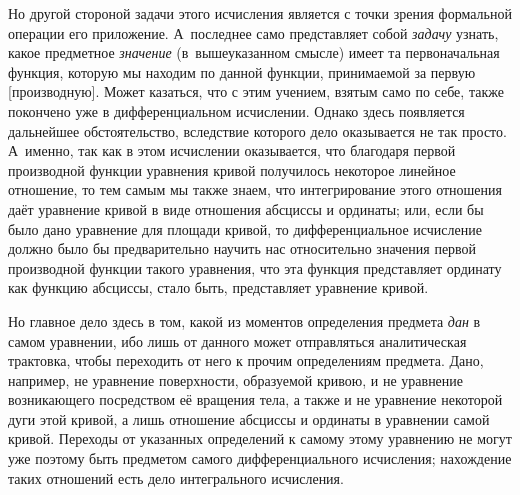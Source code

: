 Но другой стороной задачи этого исчисления является с точки зрения формальной
операции его приложение. А~последнее само представляет собой {\em задачу}
узнать, какое предметное {\em значение} (в~вышеуказанном смысле) имеет та
первоначальная функция, которую мы находим по данной функции, принимаемой за
первую [производную]. Может казаться, что с этим учением, взятым само по себе,
также покончено уже в дифференциальном исчислении. Однако здесь появляется
дальнейшее обстоятельство, вследствие которого дело оказывается не так просто.
А~именно, так как в этом исчислении оказывается, что благодаря первой
производной функции уравнения кривой получилось некоторое линейное отношение,
то тем самым мы также знаем, что интегрирование этого отношения даёт уравнение
кривой в виде отношения абсциссы и ординаты; или, если бы было дано уравнение
для площади кривой, то дифференциальное исчисление должно было бы
предварительно научить нас относительно значения первой производной функции
такого уравнения, что эта функция представляет ординату как функцию абсциссы,
стало быть, представляет уравнение кривой.

Но главное дело здесь в том, какой из моментов определения предмета {\em дан}
в самом уравнении, ибо лишь от данного может отправляться аналитическая
трактовка, чтобы переходить от него к прочим определениям предмета. Дано,
например, не уравнение поверхности, образуемой кривою, и не уравнение
возникающего посредством её вращения тела, а также и не уравнение некоторой
дуги этой кривой, а лишь отношение абсциссы и ординаты в уравнении самой
кривой. Переходы от указанных определений к самому этому уравнению не могут уже
поэтому быть предметом самого дифференциального исчисления; нахождение таких
отношений есть дело интегрального исчисления.

